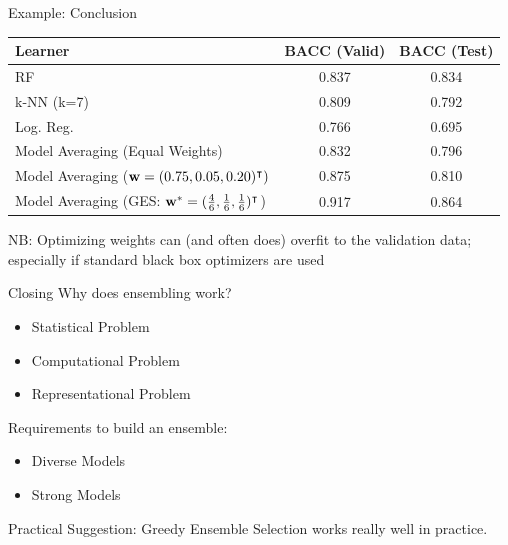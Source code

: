 \documentclass[10pt,compress,t,notes=noshow, xcolor=table]{beamer}
\begin{document}
\begin{vbframe}{Example: Conclusion}
\begin{table}[h]
\centering
\begin{tabular}{lcc}
\hline
\textbf{Learner} & \textbf{BACC} (Valid) & \textbf{BACC} (Test) \\
\hline
RF & 0.837 & 0.834 \\
k-NN (k=7) & 0.809 & 0.792 \\
Log. Reg. & 0.766 & 0.695 \\
Model Averaging (Equal Weights) & 0.832 & 0.796 \\
Model Averaging ($\mathbf{w} = (0.75, 0.05, 0.20)^\intercal)$ & 0.875 & 0.810 \\
Model Averaging (GES: $\mathbf{w}^{*} = (\frac{4}{6}, \frac{1}{6}, \frac{1}{6})^\intercal$) & 0.917 & 0.864\\
\hline
\end{tabular}
\label{table:learners_valid_test_final}
\end{table}
\vfill
NB: Optimizing weights can (and often does) overfit to the validation data; especially if standard black box optimizers are used\\
\end{vbframe}


\begin{vbframe}{Closing}
\vfill
Why does ensembling work? 
\begin{itemize}
    \item Statistical Problem
    \item Computational Problem
    \item Representational Problem
\end{itemize}
\vfill
Requirements to build an ensemble:
\begin{itemize}
    \item Diverse Models
    \item Strong Models
\end{itemize}
\vfill
Practical Suggestion: Greedy Ensemble Selection works really well in practice.
\vfill
\end{vbframe}



\endlecture
\end{document}
